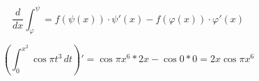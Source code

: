 \documentclass[../rgr1.tex]{subfiles}
\begin{document}

\Solution

$$
	\frac{d}{dx} \int^{\psi}_{\varphi} =
	f(\psi(x))\cdot\psi'(x) - f(\varphi(x)) \cdot \varphi'(x)
$$


\begin{dmath}
	\left( \int_0^{x^2} \cos \pi t^3 \,dt \right)' =
	\cos\pi x^6 * 2x - \cos 0 * 0 = 2x\cos\pi x^6
\end{dmath}

\end{document}
